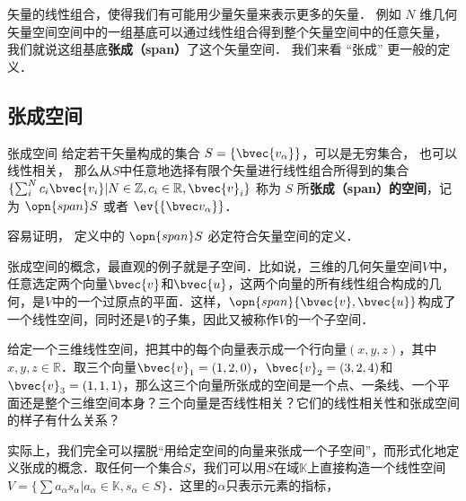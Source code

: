 

矢量的线性组合，使得我们有可能用少量矢量来表示更多的矢量． 例如 $N$ 维几何矢量空间空间中的一组基底可以通过线性组合得到整个矢量空间中的任意矢量， 我们就说这组基底\textbf{张成（span）}了这个矢量空间． 我们来看 “张成” 更一般的定义．

\subsection{张成空间}

\begin{definition}{张成空间}
给定若干矢量构成的集合 $S=\{\bvec{v_\alpha}\}$，可以是无穷集合， 也可以线性相关， 那么从$S$中任意地选择有限个矢量进行线性组合所得到的集合 $\{\sum_i^N c_i\bvec{v_i}|N\in\mathbb{Z}, c_i\in\mathbb{R}, \bvec{v}_i\}$ 称为 $S$ 所\textbf{张成（span）的空间}，记为 $\opn{span} S$ 或者 $\ev{\{\bvec v_\alpha\}}$．
\end{definition}
容易证明， 定义中的 $\opn{span} S$ 必定符合矢量空间的定义．

张成空间的概念，最直观的例子就是子空间．比如说，三维的几何矢量空间$V$中，任意选定两个向量$\bvec{v}$和$\bvec{u}$，这两个向量的所有线性组合构成的几何，是$V$中的一个过原点的平面．这样，$\opn{span}\{\bvec{v}, \bvec{u}\}$构成了一个线性空间，同时还是$V$的子集，因此又被称作$V$的一个子空间．

\begin{exercise}{}
给定一个三维线性空间，把其中的每个向量表示成一个行向量$(x,y,z)$，其中$x,y,z\in\mathbb{R}$．取三个向量$\bvec{v}_1=(1,2,0)$，$\bvec{v}_2=(3,2,4)$和$\bvec{v}_3=(1,1,1)$，那么这三个向量所张成的空间是一个点、一条线、一个平面还是整个三维空间本身？三个向量是否线性相关？它们的线性相关性和张成空间的样子有什么关系？
\end{exercise}

实际上，我们完全可以摆脱“用给定空间的向量来张成一个子空间”，而形式化地定义张成的概念．取任何一个集合$S$，我们可以用$S$在域$\mathbb{K}$上直接构造一个线性空间$V=\{\sum a_\alpha s_\alpha|a_\alpha\in\mathbb{K}, s_\alpha\in S\}$．这里的$\alpha$只表示元素的指标，
